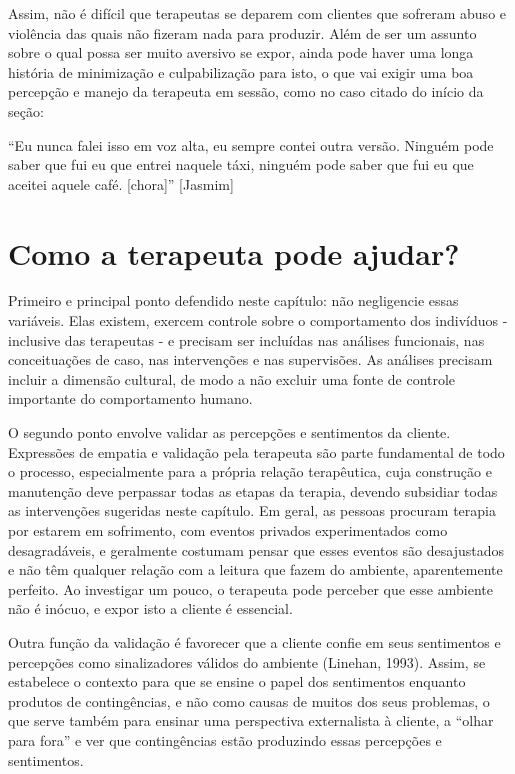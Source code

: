Assim, não é difícil que terapeutas se deparem com clientes que sofreram abuso e violência das quais não fizeram nada para produzir. Além de ser um assunto sobre o qual possa ser muito aversivo se expor, ainda pode haver uma longa história de minimização e culpabilização para isto, o que vai exigir uma boa percepção e manejo da terapeuta em sessão, como no caso citado do início da seção:

``Eu nunca falei isso em voz alta, eu sempre contei outra versão. Ninguém pode saber que fui eu que entrei naquele táxi, ninguém pode saber que fui eu que aceitei aquele café. [chora]'' [Jasmim]

\section{Como a terapeuta pode ajudar?}

Primeiro e principal ponto defendido neste capítulo: não negligencie essas variáveis. Elas existem, exercem controle sobre o comportamento dos indivíduos - inclusive das terapeutas - e precisam ser incluídas nas análises funcionais, nas conceituações de caso, nas intervenções e nas supervisões. As análises precisam incluir a dimensão cultural, de modo a não excluir uma fonte de controle importante do comportamento humano.

O segundo ponto envolve validar as percepções e sentimentos da cliente. Expressões de empatia e validação pela terapeuta são parte fundamental de todo o processo, especialmente para a própria relação terapêutica, cuja construção e manutenção deve perpassar todas as etapas da terapia, devendo subsidiar todas as intervenções sugeridas neste capítulo. Em geral, as pessoas procuram terapia por estarem em sofrimento, com eventos privados experimentados como desagradáveis, e geralmente costumam pensar que esses eventos são desajustados e não têm qualquer relação com a leitura que fazem do ambiente, aparentemente perfeito. Ao investigar um pouco, o terapeuta pode perceber que esse ambiente não é inócuo, e expor isto a cliente é essencial. 

Outra função da validação é favorecer que a cliente confie em seus sentimentos e percepções como sinalizadores válidos do ambiente (Linehan, 1993). Assim, se estabelece o contexto para que se ensine o papel dos sentimentos enquanto produtos de contingências, e não como causas de muitos dos seus problemas, o que serve também para ensinar uma perspectiva externalista à cliente, a ``olhar para fora'' e ver que contingências estão produzindo essas percepções e sentimentos. 


